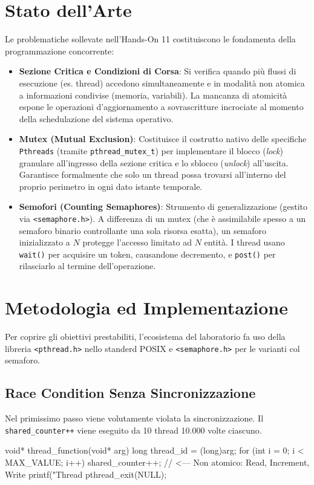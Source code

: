\documentclass[a4paper,12pt]{article}
\begin{document}
\section{Stato dell'Arte}
Le problematiche sollevate nell'Hands-On 11 costituiscono le fondamenta della programmazione concorrente:
\begin{itemize}
    \item \textbf{Sezione Critica e Condizioni di Corsa}: Si verifica quando più flussi di esecuzione (es. thread) accedono simultaneamente e in modalità non atomica a informazioni condivise (memoria, variabili). La mancanza di atomicità espone le operazioni d'aggiornamento a sovrascritture incrociate al momento della schedulazione del sistema operativo.
    \item \textbf{Mutex (Mutual Exclusion)}: Costituisce il costrutto nativo delle specifiche \texttt{Pthreads} (tramite \texttt{pthread\_mutex\_t}) per implementare il blocco (\textit{lock}) granulare all'ingresso della sezione critica e lo sblocco (\textit{unlock}) all'uscita. Garantisce formalmente che solo un thread possa trovarsi all'interno del proprio perimetro in ogni dato istante temporale.
    \item \textbf{Semofori (Counting Semaphores)}: Strumento di generalizzazione (gestito via \texttt{<semaphore.h>}). A differenza di un mutex (che è assimilabile spesso a un semaforo binario controllante una sola risorsa esatta), un semaforo inizializzato a $N$ protegge l'accesso limitato ad $N$ entità. I thread usano \texttt{wait()} per acquisire un token, causandone decremento, e \texttt{post()} per rilasciarlo al termine dell'operazione.
\end{itemize}

\section{Metodologia ed Implementazione}
Per coprire gli obiettivi prestabiliti, l'ecosistema del laboratorio fa uso della libreria \texttt{<pthread.h>} nello standerd POSIX e \texttt{<semaphore.h>} per le varianti col semaforo.

\subsection{Race Condition Senza Sincronizzazione}
Nel primissimo passo viene volutamente violata la sincronizzazione. Il \texttt{shared\_counter++} viene eseguito da 10 thread 10.000 volte ciascuno.
\begin{ccode}
void* thread_function(void* arg) {
    long thread_id = (long)arg;
    for (int i = 0; i < MAX_VALUE; i++) {
        shared_counter++; // <--- Non atomico: Read, Increment, Write
    }
    printf("Thread %
    pthread_exit(NULL);
}
\end{ccode}
\end{document}
